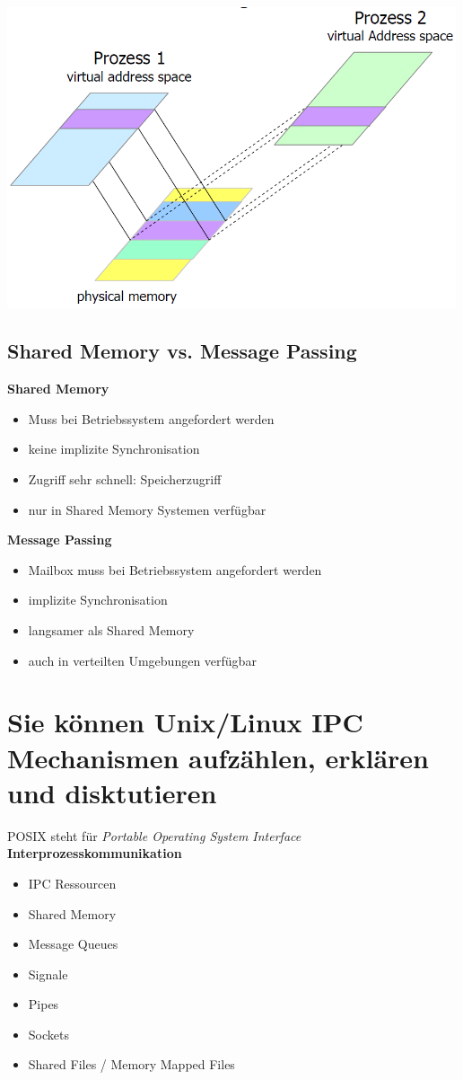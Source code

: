 \documentclass{report}
\newenvironment{Figure}
	{\par\medskip\noindent\minipage{\linewidth}}
	{\endminipage\par\medskip}
\theoremstyle{definition}
\theoremstyle{example}
\begin{document}
\begin{Figure}
\centering
\includegraphics[width=500px]{img/sharedMemory.png}
	\label{fig:Abbildung shared Memory}
\end{Figure}

	\subsection{Shared Memory vs. Message Passing}
\textbf{Shared Memory}
\begin{itemize}
	\item Muss bei Betriebssystem angefordert werden
	\item keine implizite Synchronisation
	\item Zugriff sehr schnell: Speicherzugriff
	\item nur in Shared Memory Systemen verfügbar
\end{itemize}

\textbf{Message Passing}
\begin{itemize}
	\item Mailbox muss bei Betriebssystem angefordert werden
	\item implizite Synchronisation
	\item langsamer als Shared Memory
	\item auch in verteilten Umgebungen verfügbar
\end{itemize}

\section{Sie können Unix/Linux IPC Mechanismen aufzählen, erklären und disktutieren}
POSIX steht für \textit{Portable Operating System Interface}\\
\textbf{Interprozesskommunikation}
\begin{itemize}
	\item IPC Ressourcen
	\item Shared Memory
	\item Message Queues
	\item Signale
	\item Pipes
	\item Sockets
	\item Shared Files / Memory Mapped Files
\end{itemize}
\end{document}
